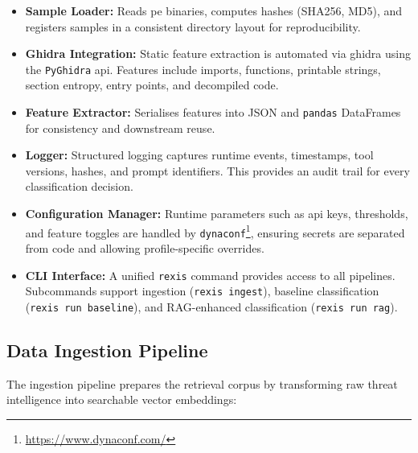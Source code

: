 \begin{itemize}
      \item \textbf{Sample Loader:} Reads \gls{pe} binaries, computes hashes (SHA256, MD5),
            and registers samples in a consistent directory layout for reproducibility.

      \item \textbf{Ghidra Integration:} Static feature extraction is automated via
            \gls{ghidra} using the \texttt{PyGhidra} \gls{api}. Features include imports, functions,
            printable strings, section entropy, entry points, and decompiled code.

      \item \textbf{Feature Extractor:} Serialises features into JSON and \texttt{pandas}
            DataFrames for consistency and downstream reuse.

      \item \textbf{Logger:} Structured logging captures runtime events, timestamps,
            tool versions, hashes, and prompt identifiers. This provides an audit trail
            for every classification decision.

      \item \textbf{Configuration Manager:} Runtime parameters such as \gls{api} keys,
            thresholds, and feature toggles are handled by
            \texttt{dynaconf}\footnote{\url{https://www.dynaconf.com/}}, ensuring secrets
            are separated from code and allowing profile-specific overrides.

      \item \textbf{CLI Interface:} A unified \texttt{rexis} command provides access
            to all pipelines. Subcommands support ingestion
            (\texttt{rexis ingest}), baseline classification (\texttt{rexis run baseline}),
            and RAG-enhanced classification (\texttt{rexis run rag}).
\end{itemize}

\subsection{Data Ingestion Pipeline}\label{subsec:DataIngestionImpl}
The ingestion pipeline prepares the retrieval corpus by transforming raw threat intelligence into
searchable vector embeddings:

